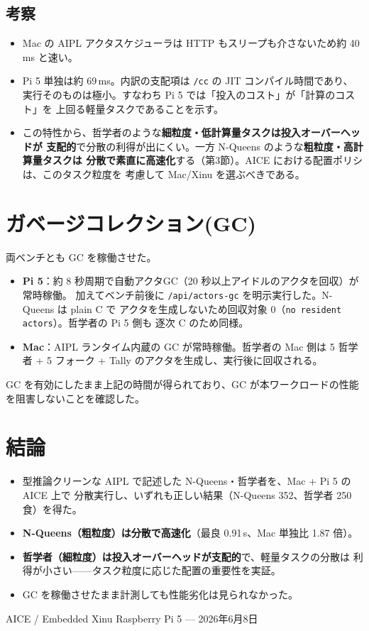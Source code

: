 \documentclass[a4paper,11pt]{ltjsarticle}
\newcommand{\cmd}[1]{\texttt{#1}}
\begin{document}
\subsection{考察}
\begin{itemize}[noitemsep]
  \item Mac の AIPL アクタスケジューラは HTTP もスリープも介さないため約 40\,ms と速い。
  \item Pi 5 単独は約 69\,ms。内訳の支配項は \cmd{/cc} の JIT コンパイル時間であり、
        実行そのものは極小。すなわち Pi 5 では「投入のコスト」が「計算のコスト」を
        上回る軽量タスクであることを示す。
  \item この特性から、哲学者のような\textbf{細粒度・低計算量タスクは投入オーバーヘッドが
        支配的}で分散の利得が出にくい。一方 N-Queens のような\textbf{粗粒度・高計算量タスクは
        分散で素直に高速化}する（第3節）。AICE における配置ポリシは、このタスク粒度を
        考慮して Mac/Xinu を選ぶべきである。
\end{itemize}

\section{ガベージコレクション(GC)}
両ベンチとも GC を稼働させた。
\begin{itemize}[noitemsep]
  \item \textbf{Pi 5}：約 8 秒周期で自動アクタGC（20 秒以上アイドルのアクタを回収）が常時稼働。
        加えてベンチ前後に \cmd{/api/actors-gc} を明示実行した。N-Queens は plain C で
        アクタを生成しないため回収対象 0（\texttt{no resident actors}）。哲学者の Pi 5 側も
        逐次 C のため同様。
  \item \textbf{Mac}：AIPL ランタイム内蔵の GC が常時稼働。哲学者の Mac 側は 5 哲学者
        + 5 フォーク + Tally のアクタを生成し、実行後に回収される。
\end{itemize}
GC を有効にしたまま上記の時間が得られており、GC が本ワークロードの性能を阻害しないことを確認した。

\section{結論}
\begin{itemize}[noitemsep]
  \item 型推論クリーンな AIPL で記述した N-Queens・哲学者を、Mac + Pi 5 の AICE 上で
        分散実行し、いずれも正しい結果（N-Queens 352、哲学者 250 食）を得た。
  \item \textbf{N-Queens（粗粒度）は分散で高速化}（最良 0.91\,s、Mac 単独比 1.87 倍）。
  \item \textbf{哲学者（細粒度）は投入オーバーヘッドが支配的}で、軽量タスクの分散は
        利得が小さい——タスク粒度に応じた配置の重要性を実証。
  \item GC を稼働させたまま計測しても性能劣化は見られなかった。
\end{itemize}

\vfill
\begin{center}\small AICE / Embedded Xinu Raspberry Pi 5 — 2026年6月8日\end{center}
\end{document}
